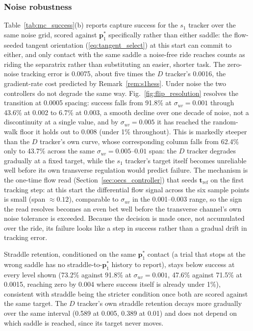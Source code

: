 \documentclass[lettersize,journal]{IEEEtran}
\begin{document}
\subsubsection{Noise robustness}
Table~\ref{tab:mc_success}(b) reports capture success for the $s_1$
tracker over the same noise grid, scored against $\mathbf{p}^*_1$
specifically rather than either saddle: the flow-seeded tangent
orientation (\ref{eq:tangent_select}) at this start can commit to
either, and only contact with the same saddle a noise-free ride
reaches counts as riding the separatrix rather than substituting an
easier, shorter task. The zero-noise tracking error is 0.0075, about
five times the $D$ tracker's 0.0016, the gradient-rate cost predicted
by Remark~\ref{rem:s1hess}. Under noise the two controllers do not
degrade the same way. Fig.~\ref{fig:flip_resolution} resolves the
transition at 0.0005 spacing: success falls from 91.8\% at
$\sigma_{uv} = 0.001$ through 43.6\% at 0.002 to 6.7\% at 0.003, a
smooth decline over one decade of noise, not a discontinuity at a
single value, and by $\sigma_{uv} = 0.005$ it has reached the
random-walk floor it holds out to 0.008 (under 1\% throughout). This is
markedly steeper than the $D$ tracker's own curve, whose corresponding
column falls from 62.4\% only to 43.7\% across the same
$\sigma_{uv} = 0.005$--$0.01$ span: the $D$ tracker degrades gradually
at a fixed target, while the $s_1$ tracker's target itself becomes
unreliable well before its own transverse regulation would predict
failure. The mechanism is the one-time flow read
(Section~\ref{sec:oecs_controller}) that seeds $\mathbf{t}_{\text{ref}}$
on the first tracking step: at this start the differential flow signal
across the six sample points is small (span $\approx 0.12$), comparable
to $\sigma_{uv}$ in the 0.001--0.003 range, so the sign the read
resolves becomes an even bet well before the transverse channel's own
noise tolerance is exceeded. Because the decision is made once, not
accumulated over the ride, its failure looks like a step in success
rather than a gradual drift in tracking error.

Straddle retention, conditioned on the same $\mathbf{p}^*_1$ contact
(a trial that stops at the wrong saddle has no straddle-to-$\mathbf{p}^*_1$
history to report), stays below success at every level shown
(73.2\% against 91.8\% at $\sigma_{uv} = 0.001$, 47.6\% against 71.5\%
at 0.0015, reaching zero by 0.004 where success itself is already under
1\%), consistent with straddle being the stricter condition once both
are scored against the same target. The $D$ tracker's own straddle
retention decays more gradually over the same interval (0.589 at 0.005,
0.389 at 0.01) and does not depend on which saddle is reached, since its
target never moves.
\end{document}
